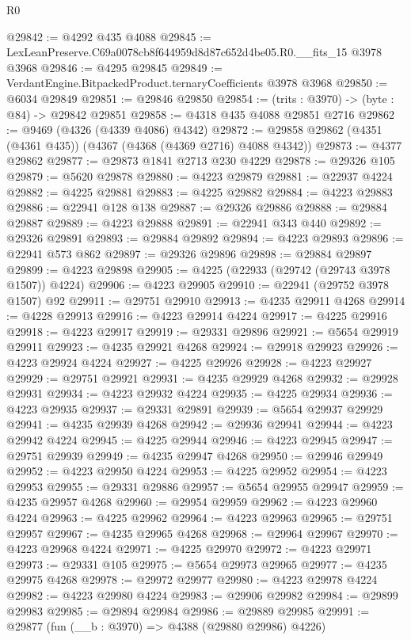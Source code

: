 \begin{lexlean}{R0}
\begin{coremodule}
@29842 := @4292 @435 @4088
@29845 := LexLeanPreserve.C69a0078cb8f644959d8d87c652d4be05.R0.__fits_15 @3978 @3968
@29846 := @4295 @29845
@29849 := VerdantEngine.BitpackedProduct.ternaryCoefficients @3978 @3968
@29850 := @6034 @29849
@29851 := @29846 @29850
@29854 := (trits : @3970) -> (byte : @84) -> @29842 @29851
@29858 := @4318 @435 @4088 @29851 @2716
@29862 := @9469 (@4326 (@4339 @4086) @4342)
@29872 := @29858 @29862 (@4351 (@4361 @435)) (@4367 (@4368 (@4369 @2716) @4088 @4342))
@29873 := @4377 @29862
@29877 := @29873 @1841 @2713 @230 @4229
@29878 := @29326 @105
@29879 := @5620 @29878
@29880 := @4223 @29879
@29881 := @22937 @4224
@29882 := @4225 @29881
@29883 := @4225 @29882
@29884 := @4223 @29883
@29886 := @22941 @128 @138
@29887 := @29326 @29886
@29888 := @29884 @29887
@29889 := @4223 @29888
@29891 := @22941 @343 @440
@29892 := @29326 @29891
@29893 := @29884 @29892
@29894 := @4223 @29893
@29896 := @22941 @573 @862
@29897 := @29326 @29896
@29898 := @29884 @29897
@29899 := @4223 @29898
@29905 := @4225 (@22933 (@29742 (@29743 @3978 @1507)) @4224)
@29906 := @4223 @29905
@29910 := @22941 (@29752 @3978 @1507) @92
@29911 := @29751 @29910
@29913 := @4235 @29911 @4268
@29914 := @4228 @29913
@29916 := @4223 @29914 @4224
@29917 := @4225 @29916
@29918 := @4223 @29917
@29919 := @29331 @29896
@29921 := @5654 @29919 @29911
@29923 := @4235 @29921 @4268
@29924 := @29918 @29923
@29926 := @4223 @29924 @4224
@29927 := @4225 @29926
@29928 := @4223 @29927
@29929 := @29751 @29921
@29931 := @4235 @29929 @4268
@29932 := @29928 @29931
@29934 := @4223 @29932 @4224
@29935 := @4225 @29934
@29936 := @4223 @29935
@29937 := @29331 @29891
@29939 := @5654 @29937 @29929
@29941 := @4235 @29939 @4268
@29942 := @29936 @29941
@29944 := @4223 @29942 @4224
@29945 := @4225 @29944
@29946 := @4223 @29945
@29947 := @29751 @29939
@29949 := @4235 @29947 @4268
@29950 := @29946 @29949
@29952 := @4223 @29950 @4224
@29953 := @4225 @29952
@29954 := @4223 @29953
@29955 := @29331 @29886
@29957 := @5654 @29955 @29947
@29959 := @4235 @29957 @4268
@29960 := @29954 @29959
@29962 := @4223 @29960 @4224
@29963 := @4225 @29962
@29964 := @4223 @29963
@29965 := @29751 @29957
@29967 := @4235 @29965 @4268
@29968 := @29964 @29967
@29970 := @4223 @29968 @4224
@29971 := @4225 @29970
@29972 := @4223 @29971
@29973 := @29331 @105
@29975 := @5654 @29973 @29965
@29977 := @4235 @29975 @4268
@29978 := @29972 @29977
@29980 := @4223 @29978 @4224
@29982 := @4223 @29980 @4224
@29983 := @29906 @29982
@29984 := @29899 @29983
@29985 := @29894 @29984
@29986 := @29889 @29985
@29991 := @29877 (fun (__b : @3970) => @4388 (@29880 @29986) @4226)

\end{coremodule}
\end{lexlean}
